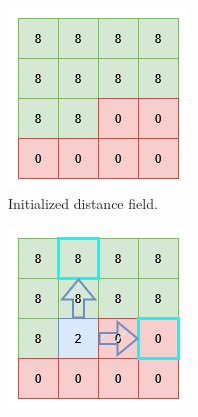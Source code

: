 \begin{figure}[htbp]
    \centering
    \begin{subfigure}[t]{0.32\textwidth}
        \centering
        \includegraphics[width=\textwidth]{figures/voxel_grid_fmm_init.drawio.png}
        \caption{Initialized distance field.}
    \end{subfigure}
    \hfill
    \begin{subfigure}[t]{0.32\textwidth}
        \centering
        \includegraphics[width=\textwidth]{figures/jfa_pass_1.drawio.png}

\end{subfigure}
\end{figure}
